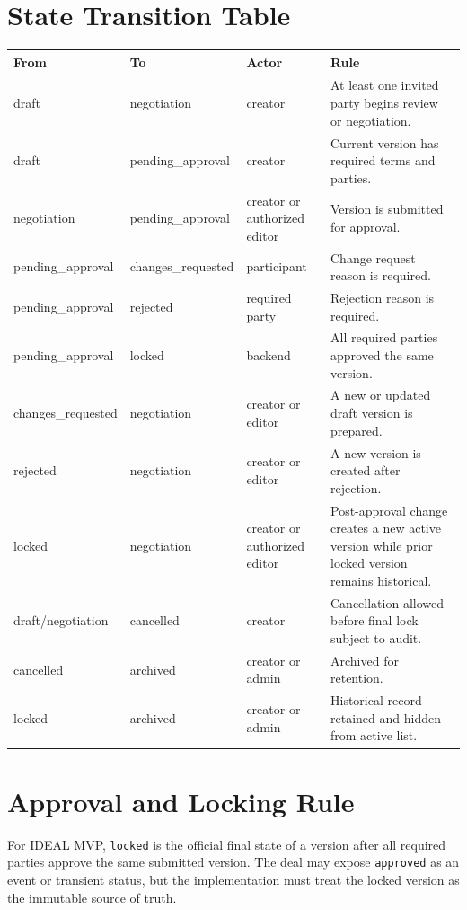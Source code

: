 \section{State Transition Table}
\begin{longtable}{p{}p{}p{}p{}}
\toprule
From & To & Actor & Rule \\
\midrule
draft & negotiation & creator & At least one invited party begins review or negotiation. \\
draft & pending\_approval & creator & Current version has required terms and parties. \\
negotiation & pending\_approval & creator or authorized editor & Version is submitted for approval. \\
pending\_approval & changes\_requested & participant & Change request reason is required. \\
pending\_approval & rejected & required party & Rejection reason is required. \\
pending\_approval & locked & backend & All required parties approved the same version. \\
changes\_requested & negotiation & creator or editor & A new or updated draft version is prepared. \\
rejected & negotiation & creator or editor & A new version is created after rejection. \\
locked & negotiation & creator or authorized editor & Post-approval change creates a new active version while prior locked version remains historical. \\
draft/negotiation & cancelled & creator & Cancellation allowed before final lock subject to audit. \\
cancelled & archived & creator or admin & Archived for retention. \\
locked & archived & creator or admin & Historical record retained and hidden from active list. \\
\bottomrule
\end{longtable}

\section{Approval and Locking Rule}
For IDEAL MVP, \texttt{locked} is the official final state of a version after all required parties approve the same submitted version. The deal may expose \texttt{approved} as an event or transient status, but the implementation must treat the locked version as the immutable source of truth.
